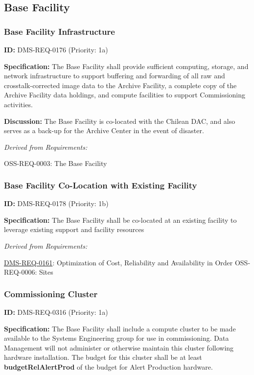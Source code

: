 \documentclass[SE,toc,lsstdraft]{lsstdoc}
\begin{document}
\subsection{Base Facility}

\subsubsection{Base Facility Infrastructure}

\label{DMS-REQ-0176}
\textbf{ID:} DMS-REQ-0176 (Priority: 1a)

\textbf{Specification:} The Base Facility shall provide sufficient computing, storage, and network infrastructure to support buffering and forwarding of all raw and crosstalk-corrected image data to the Archive Facility, a complete copy of the Archive Facility data holdings, and compute facilities to support Commissioning activities.

\textbf{Discussion:} The Base Facility is co-located with the Chilean DAC, and also serves as a back-up for the Archive Center in the event of disaster.

\emph{Derived from Requirements:}

OSS-REQ-0003:
The Base Facility \newline

\subsubsection{Base Facility Co-Location with Existing Facility}

\label{DMS-REQ-0178}
\textbf{ID:} DMS-REQ-0178 (Priority: 1b)

\textbf{Specification:} The Base Facility shall be co-located at an existing facility to leverage existing support and facility resources

\emph{Derived from Requirements:}

\hyperref[DMS-REQ-0161]{DMS-REQ-0161}:
Optimization of Cost, Reliability and Availability in Order \newline
OSS-REQ-0006:
Sites \newline

\subsubsection{Commissioning Cluster}

\label{DMS-REQ-0316}
\textbf{ID:} DMS-REQ-0316 (Priority: 1a)

\textbf{Specification:} The Base Facility shall include a compute cluster to be made available to the Systems Engineering group for use in commissioning.  Data Management will not administer or otherwise maintain this cluster following hardware installation. The budget for this cluster shall be at least \textbf{budgetRelAlertProd} of the budget for Alert Production hardware.
\end{document}
